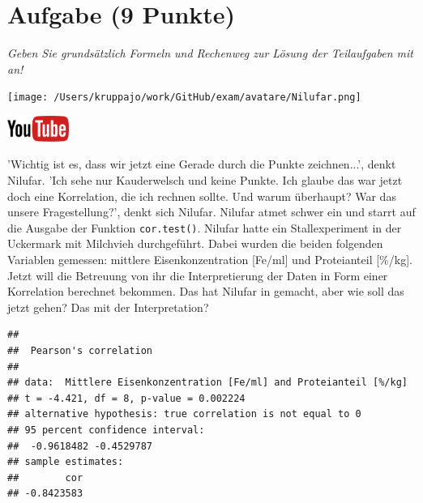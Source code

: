 \documentclass[a4paper, 9pt]{scrartcl}\usepackage[]{graphicx}\usepackage[]{xcolor}
\makeatletter
\newenvironment{kframe}{%
 \def\at@end@of@kframe{}%
 \ifinner\ifhmode%
  \def\at@end@of@kframe{\end{minipage}}%
  \begin{minipage}{\columnwidth}%
 \fi\fi%
 \def\FrameCommand##1{\hskip\@totalleftmargin \hskip-\fboxsep
 \colorbox{shadecolor}{##1}\hskip-\fboxsep
     \hskip-\linewidth \hskip-\@totalleftmargin \hskip\columnwidth}%
 \MakeFramed {\advance\hsize-\width
   \@totalleftmargin\z@ \linewidth\hsize
   \@setminipage}}%
 {\par\unskip\endMakeFramed%
 \at@end@of@kframe}
\newenvironment{knitrout}{}{} %
\makeatother
\begin{document}
\clearpage

\section{Aufgabe \hfill (9 Punkte)}

\textit{Geben Sie grundsätzlich Formeln und Rechenweg zur Lösung der Teilaufgaben mit an!} \\[1Ex]
 

 
\begin{minipage}[t]{0.5\textwidth}
\texttt{[image: /Users/kruppajo/work/GitHub/exam/avatare/Nilufar.png]}
\end{minipage}
\begin{minipage}[t]{0.5\textwidth}
\hfill
\href{https://youtu.be/C9skfFRTHhI}{\includegraphics[width = 2cm]{img/youtube}}
\end{minipage}
\vspace{1ex}



'Wichtig ist es, dass wir jetzt eine Gerade durch die Punkte zeichnen...', denkt Nilufar. 'Ich sehe nur Kauderwelsch und keine Punkte. Ich glaube das war jetzt doch eine Korrelation, die ich rechnen sollte. Und warum überhaupt? War das unsere Fragestellung?', denkt sich Nilufar. Nilufar atmet schwer ein und starrt auf die \Rlogo Ausgabe der Funktion \texttt{cor.test()}. Nilufar hatte ein Stallexperiment in der Uckermark mit Milchvieh durchgeführt. Dabei wurden die beiden folgenden Variablen gemessen: mittlere Eisenkonzentration [Fe/ml] und Proteianteil [\%/kg]. Jetzt will die Betreuung von ihr die Interpretierung der Daten in Form einer Korrelation berechnet bekommen. Das hat Nilufar in \Rlogo gemacht, aber wie soll das jetzt gehen? Das mit der Interpretation?


\begin{knitrout}
\color{fgcolor}\begin{kframe}
\begin{verbatim}
## 
## 	Pearson's correlation
## 
## data:  Mittlere Eisenkonzentration [Fe/ml] and Proteianteil [%/kg]
## t = -4.421, df = 8, p-value = 0.002224
## alternative hypothesis: true correlation is not equal to 0
## 95 percent confidence interval:
##  -0.9618482 -0.4529787
## sample estimates:
##        cor 
## -0.8423583
\end{verbatim}
\end{kframe}
\end{knitrout}
\end{document}

